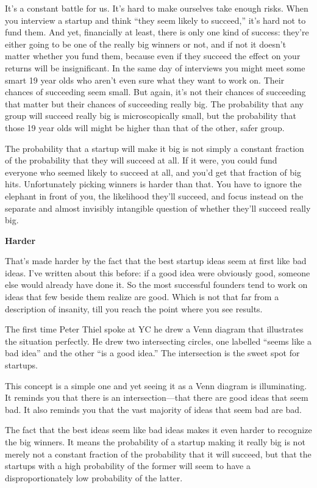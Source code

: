 It's a constant battle for us. It's hard to make ourselves take enough
risks. When you interview a startup and think ``they seem likely to
succeed,'' it's hard not to fund them. And yet, financially at least,
there is only one kind of success: they're either going to be one of the
really big winners or not, and if not it doesn't matter whether you fund
them, because even if they succeed the effect on your returns will be
insignificant. In the same day of interviews you might meet some smart
19 year olds who aren't even sure what they want to work on. Their
chances of succeeding seem small. But again, it's not their chances of
succeeding that matter but their chances of succeeding really big. The
probability that any group will succeed really big is microscopically
small, but the probability that those 19 year olds will might be higher
than that of the other, safer group.

The probability that a startup will make it big is not simply a constant
fraction of the probability that they will succeed at all. If it were,
you could fund everyone who seemed likely to succeed at all, and you'd
get that fraction of big hits. Unfortunately picking winners is harder
than that. You have to ignore the elephant in front of you, the
likelihood they'll succeed, and focus instead on the separate and almost
invisibly intangible question of whether they'll succeed really big.

\textbf{Harder}

That's made harder by the fact that the best startup ideas seem at first
like bad ideas. I've written about this before: if a good idea were
obviously good, someone else would already have done it. So the most
successful founders tend to work on ideas that few beside them realize
are good. Which is not that far from a description of insanity, till you
reach the point where you see results.

The first time Peter Thiel spoke at YC he drew a Venn diagram that
illustrates the situation perfectly. He drew two intersecting circles,
one labelled ``seems like a bad idea'' and the other ``is a good idea.''
The intersection is the sweet spot for startups.

This concept is a simple one and yet seeing it as a Venn diagram is
illuminating. It reminds you that there is an intersection---that there
are good ideas that seem bad. It also reminds you that the vast majority
of ideas that seem bad are bad.

The fact that the best ideas seem like bad ideas makes it even harder to
recognize the big winners. It means the probability of a startup making
it really big is not merely not a constant fraction of the probability
that it will succeed, but that the startups with a high probability of
the former will seem to have a disproportionately low probability of the
latter.

